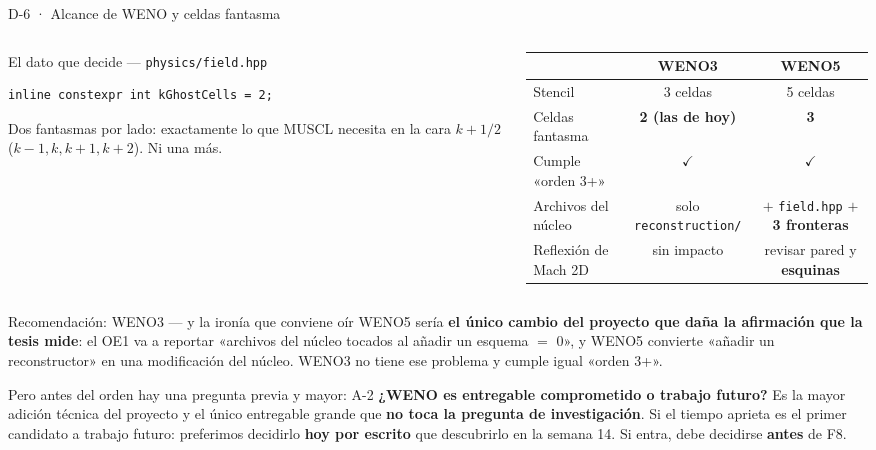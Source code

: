 \documentclass[aspectratio=169,10pt]{beamer}
\newcommand{\si}{\textcolor{verde}{$\checkmark$}}
\newcommand{\cod}[1]{\texttt{\small #1}}
\begin{document}
\begin{frame}[fragile]{D-6 · Alcance de WENO y celdas fantasma}

  \begin{columns}[t]
    \begin{column}{0.48\textwidth}
      \begin{block}{El dato que decide — \cod{physics/field.hpp}}
\begin{lstlisting}
inline constexpr int kGhostCells = 2;
\end{lstlisting}
        \scriptsize
        Dos fantasmas por lado: exactamente lo que MUSCL necesita en la cara
        $k+1/2$ ($k-1,k,k+1,k+2$). Ni una más.
      \end{block}
    \end{column}
    \begin{column}{0.52\textwidth}
      \centering\scriptsize
      \begin{tabular}{@{}lcc@{}}
        \toprule
        & \textbf{WENO3} & \textbf{WENO5} \\
        \midrule
        Stencil            & 3 celdas & 5 celdas \\
        Celdas fantasma    & \textbf{2 (las de hoy)} & \textbf{3} \\
        Cumple «orden 3+»  & \si & \si \\
        Archivos del núcleo& solo \cod{reconstruction/} & $+$ \cod{field.hpp} $+$ \textbf{3 fronteras} \\
        Reflexión de Mach 2D & sin impacto & revisar pared y \textbf{esquinas} \\
        \bottomrule
      \end{tabular}
    \end{column}
  \end{columns}

  \vspace{0.4em}
  \begin{exampleblock}{Recomendación: WENO3 — y la ironía que conviene oír}
    \scriptsize
    WENO5 sería \textbf{el único cambio del proyecto que daña la afirmación que la
    tesis mide}: el OE1 va a reportar «archivos del núcleo tocados al añadir un
    esquema $=$ 0», y WENO5 convierte «añadir un reconstructor» en una modificación
    del núcleo. WENO3 no tiene ese problema y cumple igual «orden 3+».
  \end{exampleblock}

  \begin{alertblock}{Pero antes del orden hay una pregunta previa y mayor: A-2}
    \scriptsize
    \textbf{¿WENO es entregable comprometido o trabajo futuro?} Es la mayor adición
    técnica del proyecto y el único entregable grande que \textbf{no toca la
    pregunta de investigación}. Si el tiempo aprieta es el primer candidato a
    trabajo futuro: preferimos decidirlo \textbf{hoy por escrito} que descubrirlo
    en la semana 14. Si entra, debe decidirse \textbf{antes} de F8.
  \end{alertblock}
\end{frame}
\end{document}
